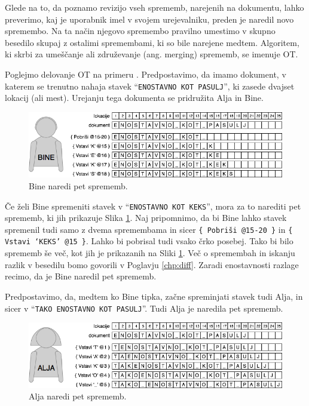 \documentclass[a4paper, 12pt, twoside]{book}
\begin{document}
Glede na to, da poznamo revizijo vseh sprememb, narejenih na dokumentu, lahko preverimo, kaj je uporabnik imel v svojem urejevalniku, preden je naredil novo spremembo. Na ta način njegovo spremembo pravilno umestimo v skupno besedilo skupaj z ostalimi spremembami, ki so bile narejene medtem. Algoritem, ki skrbi za umeščanje ali združevanje (ang. merging) sprememb, se imenuje OT.

Poglejmo delovanje OT na primeru \cite{gdocs22}. Predpostavimo, da imamo dokument, v katerem se trenutno nahaja stavek “{\tt ENOSTAVNO KOT PASULJ}”, ki zasede dvajset lokacij (ali mest). Urejanju tega dokumenta se pridružita Alja in Bine.

\begin{figure}[placement h]
\begin{center}
\includegraphics[width=12cm]{ot1.png}
\end{center}
\caption{Bine naredi pet sprememb.}
\label{ot1}
\end{figure}

Če želi Bine spremeniti stavek v “{\tt ENOSTAVNO KOT KEKS}”, mora za to narediti pet sprememb, ki jih prikazuje Slika \ref{ot1}. Naj pripomnimo, da bi Bine lahko stavek spremenil tudi samo z dvema spremembama in sicer {\tt \{ Pobriši @15-20 \}} in {\tt \{ Vstavi ‘KEKS’ @15 \}}. Lahko bi pobrisal tudi vsako črko posebej. Tako bi bilo sprememb še več, kot jih je prikazanih na Sliki \ref{ot1}. Več o spremembah in iskanju razlik v besedilu bomo govorili v Poglavju \ref{chp:diff}. Zaradi enostavnosti razlage recimo, da je Bine naredil pet sprememb.

Predpostavimo, da, medtem ko Bine tipka, začne spreminjati stavek tudi Alja, in sicer v “{\tt TAKO ENOSTAVNO KOT PASULJ}”. Tudi Alja je naredila pet sprememb.

\begin{figure}[placement h]
\begin{center}
\includegraphics[width=12cm]{ot2.png}
\end{center}
\caption{Alja naredi pet sprememb.}
\label{ot2}
\end{figure}
\end{document}
